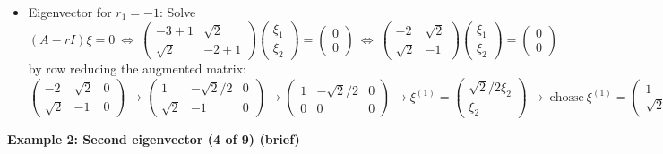 \documentclass[11pt,a4paper]{article}
\begin{document}
	\begin{itemize}
		\item Eigenvector for $r_1 = -1$: Solve
		$$
		(A-rI)\xi = 0\ \Leftrightarrow\ 
		\begin{pmatrix}
			-3+1 & \sqrt{2}\\
			\sqrt{2} & -2+1
		\end{pmatrix}
		\begin{pmatrix}
			\xi_1\\
			\xi_2
		\end{pmatrix} =
		\begin{pmatrix}
			0\\
			0
		\end{pmatrix}\ \Leftrightarrow\ 
		\begin{pmatrix}
			-2 & \sqrt{2}\\
			\sqrt{2} & -1
		\end{pmatrix}
		\begin{pmatrix}
			\xi_1\\
			\xi_2
		\end{pmatrix}=
		\begin{pmatrix}
			0\\
			0
		\end{pmatrix}
		$$
		by row reducing the augmented matrix:\\
		$
		\begin{pmatrix}
			-2 & \sqrt{2} & 0\\
			\sqrt{2} & -1 & 0
		\end{pmatrix}\to
		\begin{pmatrix}
			1 & -\sqrt{2}/2 & 0\\
			\sqrt{2} & -1 & 0
		\end{pmatrix}\to
		\begin{pmatrix}
			1 & -\sqrt{2}/2 & 0\\
			0 & 0 & 0
		\end{pmatrix}\to
		\xi^{(1)} =
		\begin{pmatrix}
			\sqrt{2}/2\xi_2\\
			\xi_2
		\end{pmatrix}\to\ \text{chosse}\ \xi^{(1)} =
		\begin{pmatrix}
			1\\
			\sqrt{2}
		\end{pmatrix}
		$
	\end{itemize}
	\textbf{Example 2: Second eigenvector (4 of 9) (brief)}
\end{document}
